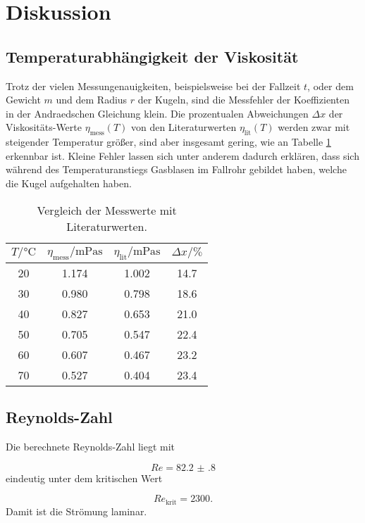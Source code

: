 \section{Diskussion}
\label{sec:Diskussion}

\subsection{Temperaturabhängigkeit der Viskosität}

Trotz der vielen Messungenauigkeiten, beispielsweise bei der Fallzeit $t$, oder
dem Gewicht $m$ und dem Radius $r$ der Kugeln, sind die Messfehler der
Koeffizienten in der Andraedschen Gleichung klein.
Die prozentualen Abweichungen $\Delta x$ der Viskositäts-Werte
$\eta_\text{mess}(T)$ von den
Literaturwerten $\eta_\text{lit}(T)$ \cite{Viskositätliteratur}
werden zwar mit steigender Temperatur größer,
sind aber insgesamt gering,
wie an Tabelle \ref{tab:VglTemperatur} erkennbar ist.
Kleine Fehler lassen sich unter anderem dadurch erklären, dass sich während des
Temperaturanstiegs Gasblasen im Fallrohr gebildet haben, welche die Kugel
aufgehalten haben.

\begin{table}[h]
  \centering
  \caption{Vergleich der Messwerte mit Literaturwerten.}
  \label{tab:VglTemperatur}
  \begin{tabular}{c c c c}
    \toprule
    $T/\si{\celsius}$ & $\eta_\text{mess}/\si{\milli\pascal\second}$ &
    $\eta_\text{lit}/\si{\milli\pascal\second}$ &
    $\Delta x/\si{\percent}$ \\
    \midrule
    20 & 1.174 & 1.002 & 14.7 \\
    30 & 0.980 & 0.798 & 18.6 \\
    40 & 0.827 & 0.653 & 21.0 \\
    50 & 0.705 & 0.547 & 22.4 \\
    60 & 0.607 & 0.467 & 23.2 \\
    70 & 0.527 & 0.404 & 23.4 \\
    \bottomrule
  \end{tabular}
\end{table}


\subsection{Reynolds-Zahl}

Die berechnete Reynolds-Zahl liegt mit

\begin{equation}
  Re = \num{82.2(8)}
\end{equation}
eindeutig unter dem kritischen Wert

\begin{equation}
  Re_\text{krit} = 2300.
\end{equation}
Damit ist die Strömung laminar.
